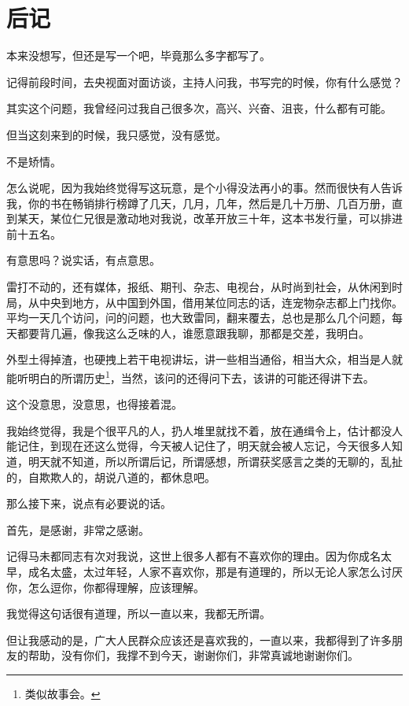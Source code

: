 \chapter*{后记}
\ifnum{}
	\begin{multicols}{\theparacolNo}
\fi
本来没想写，但还是写一个吧，毕竟那么多字都写了。

记得前段时间，去央视面对面访谈，主持人问我，书写完的时候，你有什么感觉？

其实这个问题，我曾经问过我自己很多次，高兴、兴奋、沮丧，什么都有可能。

但当这刻来到的时候，我只感觉，没有感觉。

不是矫情。

怎么说呢，因为我始终觉得写这玩意，是个小得没法再小的事。然而很快有人告诉我，你的书在畅销排行榜蹲了几天，几月，几年，然后是几十万册、几百万册，直到某天，某位仁兄很是激动地对我说，改革开放三十年，这本书发行量，可以排进前十五名。

有意思吗？说实话，有点意思。

雷打不动的，还有媒体，报纸、期刊、杂志、电视台，从时尚到社会，从休闲到时局，从中央到地方，从中国到外国，借用某位同志的话，连宠物杂志都上门找你。平均一天几个访问，问的问题，也大致雷同，翻来覆去，总也是那么几个问题，每天都要背几遍，像我这么乏味的人，谁愿意跟我聊，那都是交差，我明白。

外型土得掉渣，也硬拽上若干电视讲坛，讲一些相当通俗，相当大众，相当是人就能听明白的所谓历史\footnote{类似故事会。}，当然，该问的还得问下去，该讲的可能还得讲下去。

这个没意思，没意思，也得接着混。

我始终觉得，我是个很平凡的人，扔人堆里就找不着，放在通缉令上，估计都没人能记住，到现在还这么觉得，今天被人记住了，明天就会被人忘记，今天很多人知道，明天就不知道，所以所谓后记，所谓感想，所谓获奖感言之类的无聊的，乱扯的，自欺欺人的，胡说八道的，都休息吧。

那么接下来，说点有必要说的话。

首先，是感谢，非常之感谢。

记得马未都同志有次对我说，这世上很多人都有不喜欢你的理由。因为你成名太早，成名太盛，太过年轻，人家不喜欢你，那是有道理的，所以无论人家怎么讨厌你，怎么逗你，你都得理解，应该理解。

我觉得这句话很有道理，所以一直以来，我都无所谓。

但让我感动的是，广大人民群众应该还是喜欢我的，一直以来，我都得到了许多朋友的帮助，没有你们，我撑不到今天，谢谢你们，非常真诚地谢谢你们。


\end{multicols}
